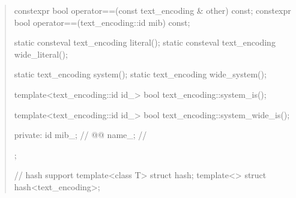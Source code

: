 \documentclass{wg21}
\begin{document}
\begin{quote}
\begin{addedblock}
\begin{codeblock}
{{    constexpr bool operator==(const text_encoding & other) const;
    constexpr bool operator==(text_encoding::id mib) const;

    static consteval text_encoding literal();
    static consteval text_encoding wide_literal();

    static text_encoding system();
    static text_encoding wide_system();
    
    
    template<text_encoding::id id_>
    bool text_encoding::system_is();
    
    template<text_encoding::id id_>
    bool text_encoding::system_wide_is();

    private:
        id mib_; // \expos
        @\impldef{}@ name_; // \expos
    };


// hash support
template<class T> struct hash;
template<> struct hash<text_encoding>;

}


\end{codeblock}
\end{addedblock}
\end{quote}
\end{document}
